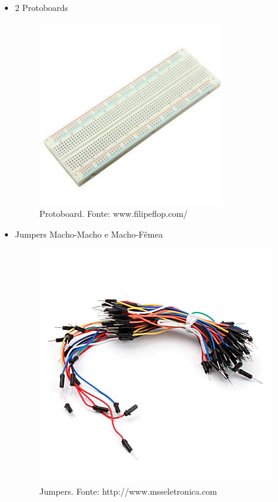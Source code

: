 \documentclass[conference]{IEEEtran}
\begin{document}
\begin{itemize}
	\item 2 Protoboards
\begin{figure}
	\centering
	\includegraphics[width=0.7\linewidth]{protoboard}
	\caption{Protoboard. Fonte: www.filipeflop.com/}
	\label{fig:protoboard}
\end{figure}

	\item Jumpers Macho-Macho e Macho-Fêmea
\begin{figure}
	\centering
	\includegraphics[width=0.7\linewidth]{jumper}
	\caption{Jumpers. Fonte: http://www.msseletronica.com}
	\label{fig:jumper}
\end{figure}


\end{itemize}
\end{document}
